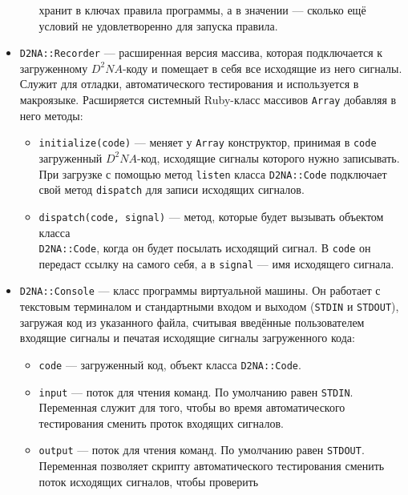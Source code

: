 \documentclass[utf8,a5paper,portrait,12pt]{eskdtext}
\begin{document}
\begin{itemize}
\begin{itemize}
                хранит в ключах правила программы, а в значении — сколько ещё
                условий не удовлетворенно для запуска правила.
        \end{itemize}
  \item \texttt{D2NA::Recorder} — расширенная версия массива, которая
        подключается к загруженному $D^2NA$-коду и помещает в себя все
        исходящие из него сигналы. Служит для отладки, автоматического
        тестирования и используется в макроязыке. Расширяется системный
        Ruby-класс массивов \texttt{Array} добавляя в него методы:
       \begin{itemize}
          \item \texttt{initialize(code)} — меняет у \texttt{Array}
                конструктор, принимая в \texttt{code} загруженный $D^2NA$-код,
                исходящие сигналы которого нужно записывать. При загрузке
                с помощью метод \texttt{listen} класса \texttt{D2NA::Code}
                подключает свой метод \texttt{dispatch} для записи исходящих
                сигналов.
          \item \texttt{dispatch(code, signal)} — метод, которые будет вызывать
                объектом класса \\ \texttt{D2NA::Code}, когда он будет посылать
                исходящий сигнал. В \texttt{code} он передаст ссылку на самого
                себя, а в \texttt{signal} — имя исходящего сигнала.
        \end{itemize}
  \item \texttt{D2NA::Console} — класс программы виртуальной машины. Он
        работает с текстовым терминалом и стандартными входом и выходом
        (\texttt{STDIN} и \texttt{STDOUT}), загружая код из указанного файла,
        считывая введённые пользователем входящие сигналы и печатая исходящие
        сигналы загруженного кода:
        \begin{itemize}
          \item \texttt{code} — загруженный код, объект класса
                \texttt{D2NA::Code}.
          \item \texttt{input} — поток для чтения команд. По умолчанию равен
                \texttt{STDIN}. Переменная служит для того, чтобы во время
                автоматического тестирования сменить проток входящих сигналов.
          \item \texttt{output} — поток для чтения команд. По умолчанию равен
                \texttt{STDOUT}. Переменная позволяет скрипту автоматического
                тестирования сменить поток исходящих сигналов, чтобы проверить

\end{itemize}
\end{itemize}
\end{document}
